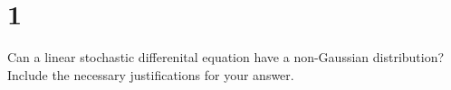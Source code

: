 \section{1}

Can a linear stochastic differenital equation have a non-Gaussian distribution? Include the necessary justifications for your answer.

